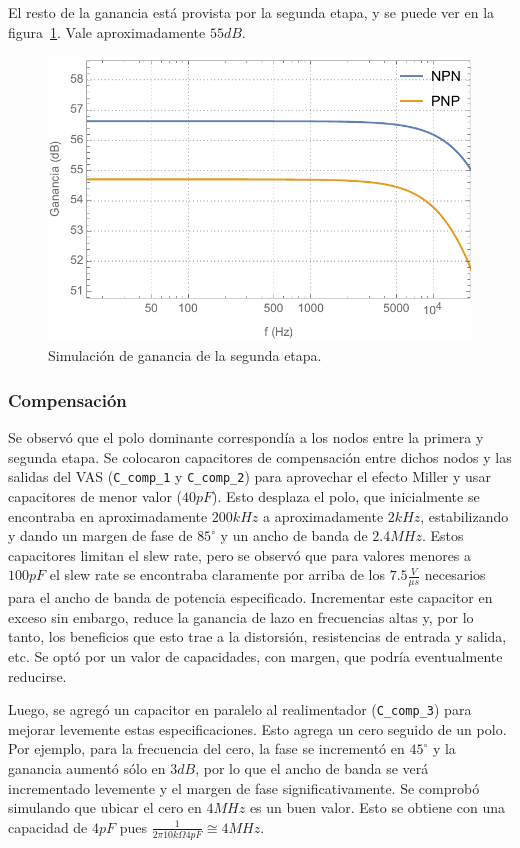 \documentclass[a4paper,12pt,twoside]{article}
\begin{document}
El resto de la ganancia está provista por la segunda etapa, y se puede ver en la figura~\ref{fig:2da-etapa-bode}. Vale aproximadamente $55dB$.

\begin{figure}[H]
	\centering
	\includegraphics[height=0.4\textwidth]{img/sim/2da-etapa-bode}
	\caption{Simulación de ganancia de la segunda etapa.}
	\label{fig:2da-etapa-bode}
\end{figure}


\subsubsection{Compensación}

Se observó que el polo dominante correspondía a los nodos entre la primera y segunda etapa. Se colocaron capacitores de compensación entre dichos nodos y las salidas del VAS (\texttt{C\_comp\_1} y \texttt{C\_comp\_2}) para aprovechar el efecto Miller y usar capacitores de menor valor ($40pF$). Esto desplaza el polo, que inicialmente se encontraba en aproximadamente $200kHz$ a aproximadamente $2kHz$, estabilizando y dando un margen de fase de $85^{\circ}$ y un ancho de banda de $2.4MHz$. Estos capacitores limitan el slew rate, pero se observó que para valores menores a $100pF$ el slew rate se encontraba claramente por arriba de los $7.5\frac{V}{\mu s}$ necesarios para el ancho de banda de potencia especificado. Incrementar este capacitor en exceso sin embargo, reduce la ganancia de lazo en frecuencias altas y, por lo tanto, los beneficios que esto trae a la distorsión, resistencias de entrada y salida, etc. Se optó por un valor de capacidades, con margen, que podría eventualmente reducirse.

Luego, se agregó un capacitor en paralelo al realimentador (\texttt{C\_comp\_3}) para mejorar levemente estas especificaciones. Esto agrega un cero seguido de un polo. Por ejemplo, para la frecuencia del cero, la fase se incrementó en $45^{\circ}$ y la ganancia aumentó sólo en $3dB$, por lo que el ancho de banda se verá incrementado levemente y el margen de fase significativamente. Se comprobó simulando que ubicar el cero en $4MHz$ es un buen valor. Esto se obtiene con una capacidad de $4pF$ pues $\frac{1}{2 \pi 10k\Omega 4pF}\cong 4MHz$.
\end{document}
